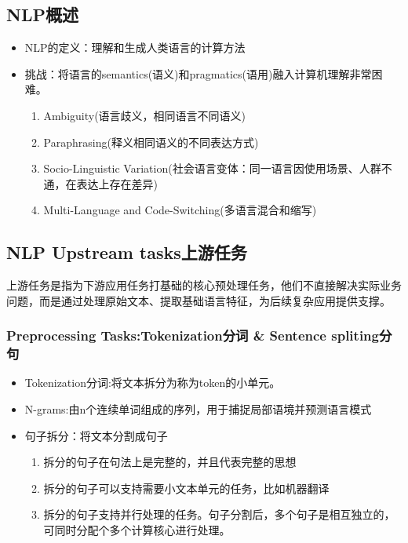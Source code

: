 \documentclass[UTF8]{ctexart}
\begin{document}
\subsection{NLP概述}
\begin{itemize}
    \item NLP的定义：理解和生成人类语言的计算方法
    \item 挑战：将语言的semantics(语义)和pragmatics(语用)融入计算机理解非常困难。
    \begin{enumerate}
        \item Ambiguity(语言歧义，相同语言不同语义)
        \item Paraphrasing(释义相同语义的不同表达方式)
        \item Socio-Linguistic Variation(社会语言变体：同一语言因使用场景、人群不通，在表达上存在差异)
        \item Multi-Language and Code-Switching(多语言混合和缩写)
    \end{enumerate}
\end{itemize}

\subsection{NLP Upstream tasks上游任务}

上游任务是指为下游应用任务打基础的核心预处理任务，他们不直接解决实际业务问题，而是通过处理原始文本、提取基础语言特征，为后续复杂应用提供支撑。

\subsubsection{Preprocessing Tasks:Tokenization分词 \& Sentence spliting分句}

\begin{itemize}
    \item Tokenization分词:将文本拆分为称为token的小单元。
    \item N-grams:由n个连续单词组成的序列，用于捕捉局部语境并预测语言模式
    \item 句子拆分：将文本分割成句子
    \begin{enumerate}
        \item 拆分的句子在句法上是完整的，并且代表完整的思想
        \item 拆分的句子可以支持需要小文本单元的任务，比如机器翻译
        \item 拆分的句子支持并行处理的任务。句子分割后，多个句子是相互独立的，可同时分配个多个计算核心进行处理。
    \end{enumerate}
\end{itemize}
\end{document}
